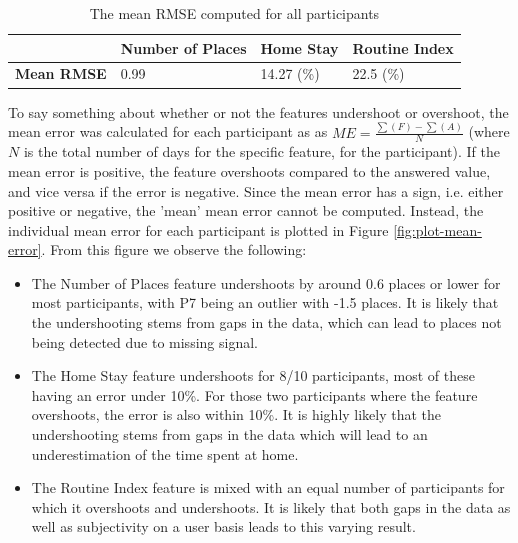 \begin{table}[]
    \centering
    \begin{tabular}{|l|l|l|l|}
    \hline
                        & \textbf{Number of Places} & \textbf{Home Stay} & \textbf{Routine Index} \\ \hline
    \textbf{Mean RMSE}       & 0.99                      & 14.27 (\%)         & 22.5 (\%)              \\ \hline
    \end{tabular}
    \caption{The mean RMSE computed for all participants}
    \label{tab:error-table}
\end{table}


To say something about whether or not the features undershoot or overshoot, the mean error was calculated for each participant as as $ME = \frac{\sum(F) - \sum(A)}{N}$ (where $N$ is the total number of days for the specific feature, for the participant). If the mean error is positive, the feature overshoots compared to the answered value, and vice versa if the error is negative. Since the mean error has a sign, i.e. either positive or negative, the 'mean' mean error cannot be computed. Instead, the individual mean error for each participant is plotted in Figure \ref{fig:plot-mean-error}. From this figure we observe the following:

\begin{itemize}
    \item The Number of Places feature undershoots by around 0.6 places or lower for most participants, with P7 being an outlier with -1.5 places. It is likely that the undershooting stems from gaps in the data, which can lead to places not being detected due to missing signal.

    \item The Home Stay feature undershoots for 8/10 participants, most of these having an error under 10\%. For those two participants where the feature overshoots, the error is also within 10\%. It is highly likely that the undershooting stems from gaps in the data which will lead to an underestimation of the time spent at home.

    \item The Routine Index feature is mixed with an equal number of participants for which it overshoots and undershoots. It is likely that both gaps in the data as well as subjectivity on a user basis leads to this varying result.
\end{itemize}


